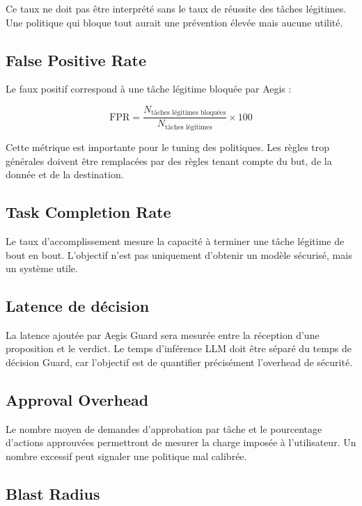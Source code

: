 Ce taux ne doit pas être interprété sans le taux de réussite des tâches légitimes. Une politique qui bloque tout aurait une prévention élevée mais aucune utilité.

\subsection{False Positive Rate}

Le faux positif correspond à une tâche légitime bloquée par Aegis :

\begin{equation}
\mathrm{FPR} = \frac{N_{\text{tâches légitimes bloquées}}}{N_{\text{tâches légitimes}}} \times 100
\end{equation}

Cette métrique est importante pour le tuning des politiques. Les règles trop générales doivent être remplacées par des règles tenant compte du but, de la donnée et de la destination.

\subsection{Task Completion Rate}

Le taux d'accomplissement mesure la capacité à terminer une tâche légitime de bout en bout. L'objectif n'est pas uniquement d'obtenir un modèle sécurisé, mais un système utile.

\subsection{Latence de décision}

La latence ajoutée par Aegis Guard sera mesurée entre la réception d'une proposition et le verdict. Le temps d'inférence LLM doit être séparé du temps de décision Guard, car l'objectif est de quantifier précisément l'overhead de sécurité.

\subsection{Approval Overhead}

Le nombre moyen de demandes d'approbation par tâche et le pourcentage d'actions approuvées permettront de mesurer la charge imposée à l'utilisateur. Un nombre excessif peut signaler une politique mal calibrée.

\subsection{Blast Radius}

